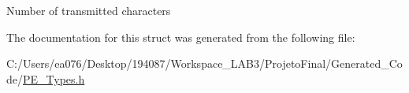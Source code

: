 Number of transmitted characters 

The documentation for this struct was generated from the following file\-:\begin{DoxyCompactItemize}
\item 
C\-:/\-Users/ea076/\-Desktop/194087/\-Workspace\-\_\-\-L\-A\-B3/\-Projeto\-Final/\-Generated\-\_\-\-Code/\hyperlink{_p_e___types_8h}{P\-E\-\_\-\-Types.\-h}\end{DoxyCompactItemize}
